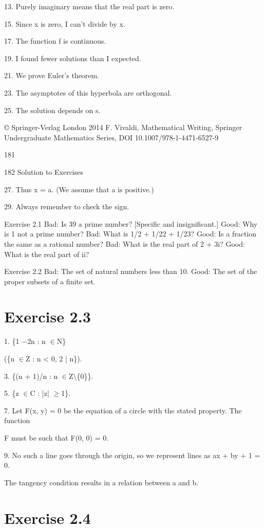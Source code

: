 \documentclass[11pt]{article}
\theoremstyle{plain}
\theoremstyle{definition}
\begin{document}
13. Purely imaginary means that the real part is zero.

15. Since x is zero, I can't divide by x.

17. The function f is continuous.

19. I found fewer solutions than I expected.

21. We prove Euler's theorem.

23. The asymptotes of this hyperbola are orthogonal.

25. The solution depends on s.

© Springer-Verlag London 2014 F. Vivaldi, Mathematical Writing, Springer Undergraduate Mathematics Series, DOI 10.1007/978-1-4471-6527-9

181

182 Solution to Exercises

27. Thus x = a. (We assume that a is positive.)

29. Always remember to check the sign.

Exercise 2.1 Bad: Is 39 a prime number? [Specific and insignificant.] Good: Why is 1 not a prime number? Bad: What is 1/2 + 1/22 + 1/23? Good: Is a fraction the same as a rational number? Bad: What is the real part of 2 + 3i? Good: What is the real part of ii?

Exercise 2.2 Bad: The set of natural numbers less than 10. Good: The set of the proper subsets of a finite set.

\section{Exercise 2.3}

1. \{1 $-$2n : n $\in$N\}

(\{n $\in$Z : n < 0, 2 | n\}).

3. \{(n + 1)/n : n $\in$Z$\setminus$\{0\}\}.

5. \{z $\in$C : |z| $\geq$1\}.

7. Let F(x, y) = 0 be the equation of a circle with the stated property. The function

F must be such that F(0, 0) = 0.

9. No such a line goes through the origin, so we represent lines as ax + by + 1 = 0.

The tangency condition results in a relation between a and b.

\section{Exercise 2.4}
\end{document}
